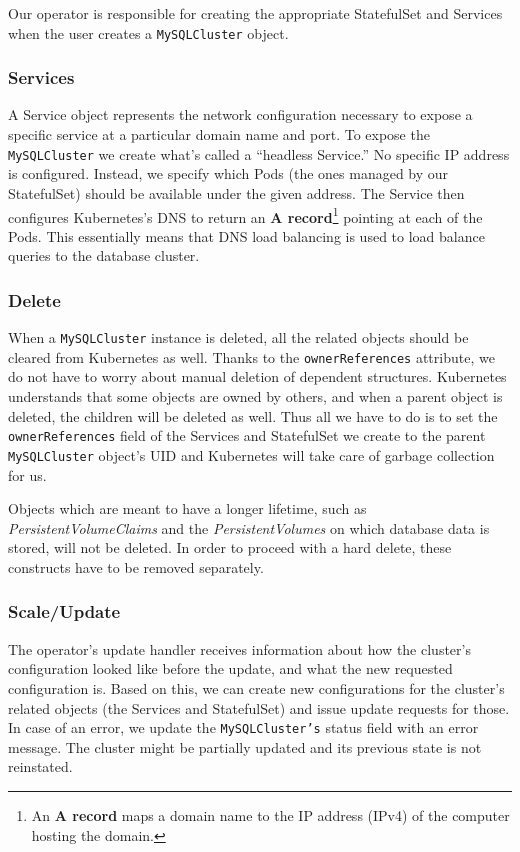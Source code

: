 Our operator is responsible for creating the appropriate StatefulSet and Services when the user
creates a \texttt{MySQLCluster} object.

\subsubsection*{Services}
A Service object represents the network configuration necessary to expose a specific service at a
particular domain name and port. To expose the \texttt{MySQLCluster} we create what’s called a
“headless Service.” No specific IP address is configured. Instead, we specify which Pods (the ones
managed by our StatefulSet) should be available under the given address. The Service then configures
Kubernetes’s DNS to return an \textbf{A record}\footnote{An \textbf{A record} maps a domain name to
the IP address (IPv4) of the computer hosting the domain.} pointing at each of the Pods. This
essentially means that DNS load balancing is used to load balance queries to the database cluster.

\subsubsection*{Delete}
When a \texttt{MySQLCluster} instance is deleted, all the related objects should be cleared from Kubernetes
as well. Thanks to the \texttt{ownerReferences} attribute, we do not have to worry about manual
deletion of dependent structures. Kubernetes understands that some objects are owned by others, and
when a parent object is deleted, the children will be deleted as well. Thus all we have to do is to set
the \texttt{ownerReferences} field of the Services and StatefulSet we create to the parent
\texttt{MySQLCluster} object’s UID and Kubernetes will take care of garbage collection for us.

Objects which are meant to have a longer lifetime, such as \textit{PersistentVolumeClaims} and the
\textit{PersistentVolumes} on which database data is stored, will not be deleted. In order to
proceed with a hard delete, these constructs have to be removed separately.

\subsubsection*{Scale/Update}
The operator’s update handler receives information about how the cluster’s configuration looked
like before the update, and what the new requested configuration is. Based on this, we can create
new configurations for the cluster’s related objects (the Services and StatefulSet) and issue update
requests for those. In case of an error, we update the \texttt{MySQLCluster’s} status field with an error
message. The cluster might be partially updated and its previous state is not reinstated.

